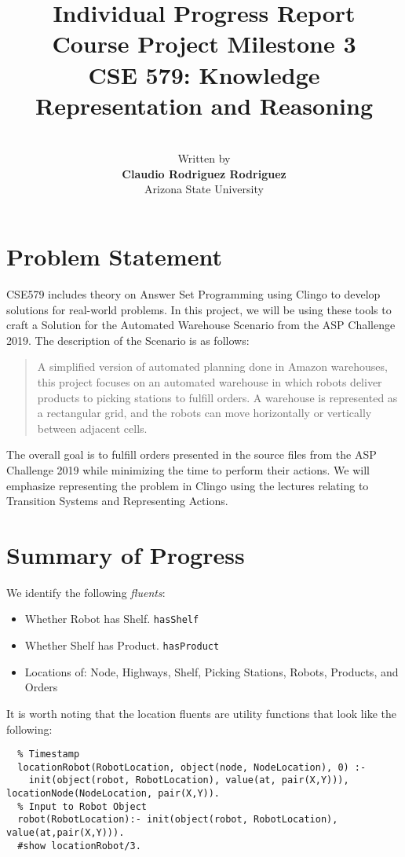 \documentclass[letterpaper]{article} %
\title{Individual Progress Report\\
Course Project Milestone 3\\
CSE 579: Knowledge Representation and Reasoning}
\author{ \\
Written by\\
\Large \textbf{Claudio Rodriguez Rodriguez} \\ 
Arizona State University}
\begin{document}
\maketitle

\section{Problem Statement}

CSE579 includes theory on Answer Set Programming using Clingo to develop solutions for real-world problems. In this project, we will be using these tools to craft a Solution for the Automated Warehouse Scenario from the ASP Challenge 2019. The description of the Scenario is as follows:

\begin{quotation}
A simplified version of automated planning done in Amazon warehouses, this project focuses on an automated warehouse in which robots deliver products to picking stations to fulﬁll orders. A warehouse is represented as a rectangular grid, and the robots can move horizontally or vertically between adjacent cells.\cite{cse579:CourseProject}
\end{quotation}

The overall goal is to fulfill orders presented in the source files from the ASP Challenge 2019 while minimizing the time to perform their actions. We will emphasize representing the problem in Clingo using the lectures relating to Transition Systems and Representing Actions.

\section{Summary of Progress}

We identify the following \textit{fluents}:

\begin{itemize}
    \item Whether Robot has Shelf. \texttt{hasShelf}
    \item Whether Shelf has Product. \texttt{hasProduct}
    \item Locations of: Node, Highways, Shelf, Picking Stations, Robots, Products, and Orders
\end{itemize}

It is worth noting that the location fluents are utility functions that look like the following:

\begin{lstlisting}[numbers=none,language=clingo]
  % Location State that depends on
  % Timestamp
  locationRobot(RobotLocation, object(node, NodeLocation), 0) :-
    init(object(robot, RobotLocation), value(at, pair(X,Y))), locationNode(NodeLocation, pair(X,Y)).
  % Input to Robot Object
  robot(RobotLocation):- init(object(robot, RobotLocation), value(at,pair(X,Y))).
  #show locationRobot/3.
\end{lstlisting}
\end{document}
